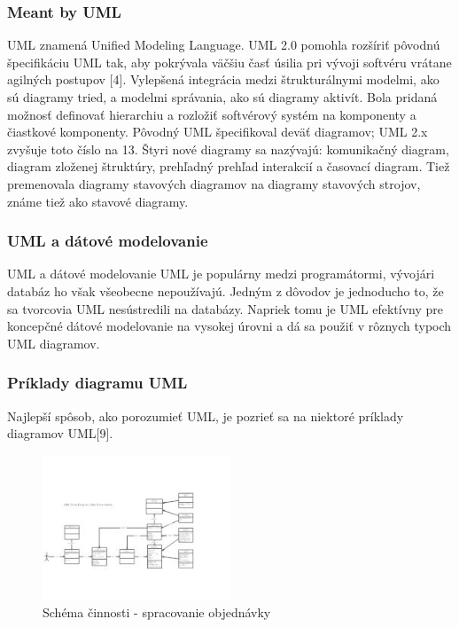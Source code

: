 \documentclass[a4paper]{feidippp}
\begin{document}
\subsubsection{Meant by UML}

UML znamená Unified Modeling Language. UML 2.0 pomohla rozšíriť pôvodnú špecifikáciu UML tak, aby pokrývala väčšiu časť úsilia pri vývoji softvéru vrátane agilných postupov [4].
Vylepšená integrácia medzi štrukturálnymi modelmi, ako sú diagramy tried, a modelmi správania, ako sú diagramy aktivít.
Bola pridaná možnosť definovať hierarchiu a rozložiť softvérový systém na komponenty a čiastkové komponenty.
Pôvodný UML špecifikoval deväť diagramov; UML 2.x zvyšuje toto číslo na 13. Štyri nové diagramy sa nazývajú: komunikačný diagram, diagram zloženej štruktúry, prehľadný prehľad interakcií a časovací diagram. Tiež premenovala diagramy stavových diagramov na diagramy stavových strojov, známe tiež ako stavové diagramy.



\subsubsection{UML a dátové modelovanie}

UML a dátové modelovanie UML je populárny medzi programátormi, vývojári databáz ho však všeobecne nepoužívajú. Jedným z dôvodov je jednoducho to, že sa tvorcovia UML nesústredili na databázy. Napriek tomu je UML efektívny pre koncepčné dátové modelovanie na vysokej úrovni a dá sa použiť v rôznych typoch UML diagramov. 

\subsubsection{Príklady diagramu UML}

Najlepší spôsob, ako porozumieť UML, je pozrieť sa na niektoré príklady diagramov UML[9]. 


\begin{figure}[!ht]
\centering 
\includegraphics[width=0.5\textwidth]{dp8.jpg}
\caption{Schéma činnosti - spracovanie objednávky}
\end{figure}
\end{document}
